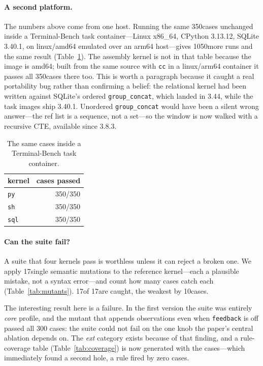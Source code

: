 \documentclass[11pt,a4paper]{article}
\begin{document}
\paragraph{A second platform.}
The numbers above come from one host. Running the same 350cases
unchanged inside a Terminal-Bench task container---Linux x86\_64, CPython
3.13.12, SQLite 3.40.1, on linux/amd64 emulated over an
arm64 host---gives 1050more runs and the same result
(Table~\ref{tab:conformancecontainer}). The assembly kernel is not in that
table because the image is amd64; built from the same source with \texttt{cc}
in a linux/arm64 container it passes all 350cases there too. This is worth a paragraph because it
caught a real portability bug rather than confirming a belief: the relational
kernel had been written against SQLite's ordered \texttt{group\_concat}, which
landed in 3.44, while the task images ship 3.40.1. Unordered
\texttt{group\_concat} would have been a silent wrong answer---the ref list is
a sequence, not a set---so the window is now walked with a recursive CTE,
available since 3.8.3.

\begin{table}[h]\centering\small
\caption{The same cases inside a Terminal-Bench task container.}
\label{tab:conformancecontainer}
\begin{tabular}{lr}
\toprule
kernel & cases passed \\
\midrule
\texttt{py} & 350/350 \\
\texttt{sh} & 350/350 \\
\texttt{sql} & 350/350 \\
\bottomrule
\end{tabular}
\end{table}

\paragraph{Can the suite fail?}
A suite that four kernels pass is worthless unless it can reject a broken one.
We apply 17single semantic mutations to the reference kernel---each a
plausible mistake, not a syntax error---and count how many cases catch each
(Table~\ref{tab:mutants}). 17of 17are caught, the weakest by
10cases.

The interesting result here is a failure. In the first version the suite was
entirely \emph{core} profile, and the mutant that appends observations even
when \texttt{feedback} is off passed all 300 cases: the suite could not fail on
the one knob the paper's central ablation depends on. The \emph{ext} category
exists because of that finding, and a rule-coverage table
(Table~\ref{tab:coverage}) is now generated with the cases---which immediately
found a second hole, a rule fired by zero cases.
\end{document}
